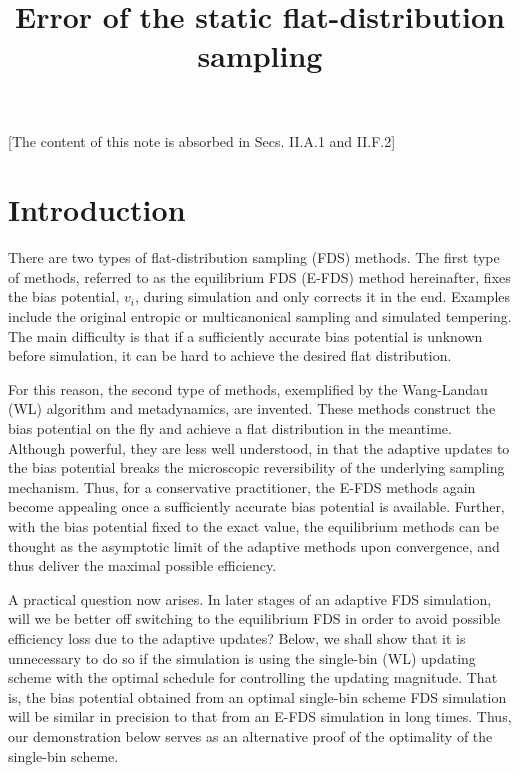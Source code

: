 \documentclass[12pt]{article}
\begin{document}
\title{Error of the static flat-distribution sampling}
\author{}
\date{\vspace{-10ex}}
\maketitle

[The content of this note is absorbed
in Secs. II.A.1 and II.F.2]

\section{Introduction}


There are two types of flat-distribution sampling (FDS) methods.
%
The first type of methods,
referred to as the equilibrium FDS (E-FDS) method hereinafter,
fixes the bias potential, $v_i$, during simulation
and only corrects it in the end.
%
Examples include the original
entropic or multicanonical sampling and simulated tempering.
%
The main difficulty is that if a sufficiently accurate bias potential
is unknown before simulation,
it can be hard to achieve the desired flat distribution.

For this reason, the second type of methods,
exemplified by the Wang-Landau (WL) algorithm and metadynamics,
are invented.
%
These methods construct the bias potential on the fly
and achieve a flat distribution in the meantime.
%
Although powerful, they are less well understood,
in that the adaptive updates to the bias potential
breaks the microscopic reversibility
of the underlying sampling mechanism.
%
Thus, for a conservative practitioner,
the E-FDS methods again become appealing
once a sufficiently accurate bias potential is available.
%
Further, with the bias potential fixed to the exact value,
the equilibrium methods can be thought as
the asymptotic limit of the adaptive methods upon convergence,
and thus deliver the maximal possible efficiency.

A practical question now arises.
%
In later stages of an adaptive FDS simulation,
will we be better off switching to the equilibrium FDS
in order to avoid possible efficiency loss due to the adaptive updates?
%
Below, we shall show that it is unnecessary to do so
if the simulation is using the single-bin (WL) updating scheme
with the optimal schedule for controlling the updating magnitude.
%
That is, the bias potential obtained from
an optimal single-bin scheme FDS simulation
will be similar in precision to that from
an E-FDS simulation in long times.
%
Thus, our demonstration below serves as an alternative proof
of the optimality of the single-bin scheme.
\end{document}
